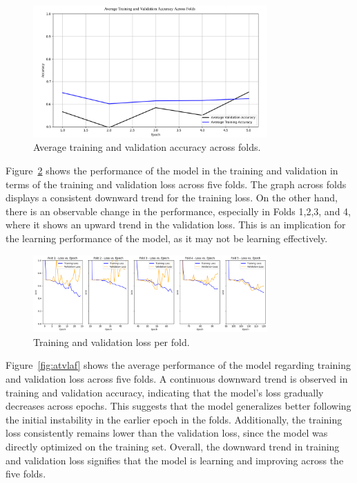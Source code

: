 \begin{figure}[!htbp]
	\centering
	\includegraphics[width=0.8\textwidth]{figures/avg_acc.png}
	\caption{Average training and validation accuracy across folds.}
	\label{fig:atvaaf}
\end{figure}

Figure~\ref{fig:tvlpf} shows the performance of the model in the training and validation in terms of the training and validation loss across five folds. The graph across folds displays a consistent downward trend for the training loss. On the other hand, there is an observable change in the performance, especially in Folds 1,2,3, and 4, where it shows an upward trend in the validation loss. This is an implication for the learning performance of the model, as it may not be learning effectively. 

\begin{figure}[!htbp]
	\centering
	\includegraphics[width=0.8\textwidth]{figures/loss_epoch.png}
	\caption{Training and validation loss per fold.}
	\label{fig:tvlpf}
\end{figure}

Figure~\ref{fig:atvlaf} shows the average performance of the model regarding training and validation loss across five folds. A continuous downward trend is observed in training and validation accuracy, indicating that the model's loss gradually decreases across epochs. This suggests that the model generalizes better following the initial instability in the earlier epoch in the folds. Additionally, the training loss consistently remains lower than the validation loss, since the model was directly optimized on the training set. Overall, the downward trend in training and validation loss signifies that the model is learning and improving across the five folds.

